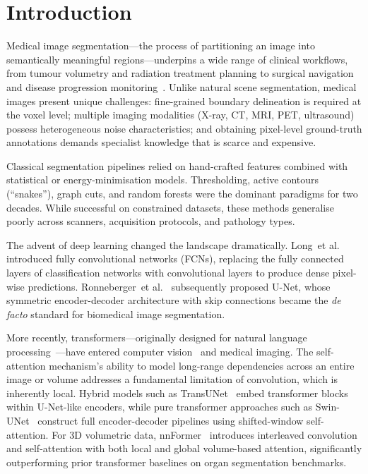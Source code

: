 \documentclass[preprint,12pt,authoryear]{elsarticle}
\begin{document}
\section{Introduction}
\label{sec:intro}

Medical image segmentation---the process of partitioning an image into
semantically meaningful regions---underpins a wide range of clinical workflows,
from tumour volumetry and radiation treatment planning to surgical navigation
and disease progression monitoring~\citep{qureshi2023review}. Unlike natural
scene segmentation, medical images present unique challenges: fine-grained
boundary delineation is required at the voxel level; multiple imaging modalities
(X-ray, CT, MRI, PET, ultrasound) possess heterogeneous noise characteristics;
and obtaining pixel-level ground-truth annotations demands specialist knowledge
that is scarce and expensive.

Classical segmentation pipelines relied on hand-crafted features combined with
statistical or energy-minimisation models. Thresholding, active contours
(``snakes''), graph cuts, and random forests were the dominant paradigms for
two decades. While successful on constrained datasets, these methods generalise
poorly across scanners, acquisition protocols, and pathology types.

The advent of deep learning changed the landscape dramatically. Long~et
al.~\citep{long2015fcn} introduced fully convolutional networks (FCNs),
replacing the fully connected layers of classification networks with
convolutional layers to produce dense pixel-wise predictions. Ronneberger~et
al.~\citep{ronneberger2015unet} subsequently proposed U-Net, whose symmetric
encoder-decoder architecture with skip connections became the \emph{de facto}
standard for biomedical image segmentation.

More recently, transformers---originally designed for natural language
processing~\citep{vaswani2017attention}---have entered computer
vision~\citep{dosovitskiy2020vit} and medical imaging. The self-attention
mechanism's ability to model long-range dependencies across an entire image
or volume addresses a fundamental limitation of convolution, which is
inherently local. Hybrid models such as TransUNet~\citep{chen2021transunet}
embed transformer blocks within U-Net-like encoders, while pure transformer
approaches such as Swin-UNet~\citep{cao2022swinunet} construct full
encoder-decoder pipelines using shifted-window self-attention. For 3D
volumetric data, nnFormer~\citep{zhou2023nnformer} introduces interleaved
convolution and self-attention with both local and global volume-based
attention, significantly outperforming prior transformer baselines on organ
segmentation benchmarks.
\end{document}
